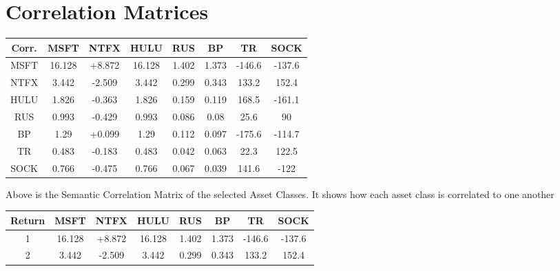 \documentclass{article}
\begin{document}
\newpage

\section{Correlation Matrices}

\vspace{1cm}

\begin{center}

\begin{tabular}{cccccccc} \toprule
    Corr. & MSFT & NTFX & HULU  & RUS & BP & TR & SOCK\\ \midrule
    MSFT  & 16.128 & +8.872 & 16.128 & 1.402 & 1.373 & -146.6 & -137.6 \\\midrule
    NTFX  & 3.442  & -2.509 & 3.442  & 0.299 & 0.343 & 133.2  & 152.4  \\\midrule
    HULU  & 1.826  & -0.363 & 1.826  & 0.159 & 0.119 & 168.5  & -161.1 \\\midrule
    RUS  & 0.993  & -0.429 & 0.993  & 0.086 & 0.08  & 25.6   & 90     \\ \midrule
    BP  & 1.29   & +0.099 & 1.29   & 0.112 & 0.097 & -175.6 & -114.7 \\\midrule
    TR  & 0.483  & -0.183 & 0.483  & 0.042 & 0.063 & 22.3   & 122.5  \\\midrule
    SOCK  & 0.766  & -0.475 & 0.766  & 0.067 & 0.039 & 141.6  & -122    \\ \bottomrule
\end{tabular}

\end{center}

Above is the Semantic Correlation Matrix of the selected Asset Classes. It shows how each asset class is correlated to one another

\vspace{1cm}



\begin{center}

\begin{tabular}{cccccccc} \toprule
    Return & MSFT & NTFX & HULU  & RUS & BP & TR & SOCK\\ \midrule
    1  & 16.128 & +8.872 & 16.128 & 1.402 & 1.373 & -146.6 & -137.6 \\
    2  & 3.442  & -2.509 & 3.442  & 0.299 & 0.343 & 133.2  & 152.4  \\

\end{tabular}

\end{center}
\end{document}
